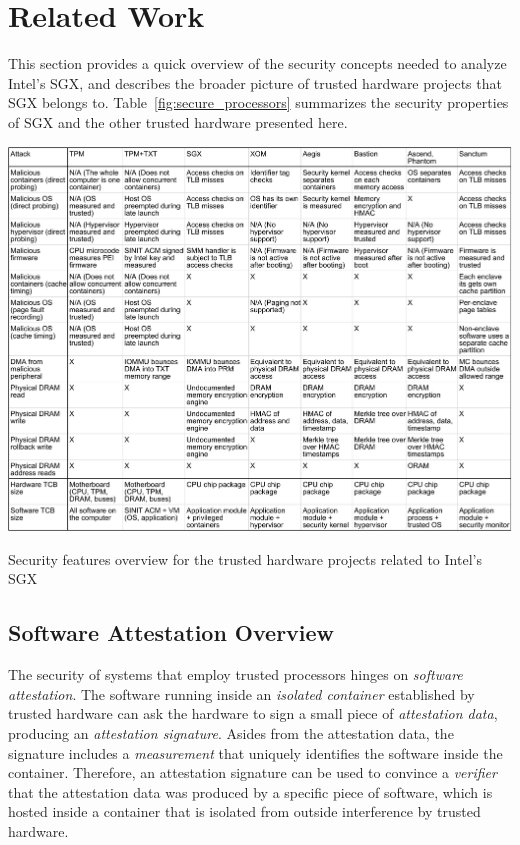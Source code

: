 \section{Related Work}
\label{sec:related}

This section provides a quick overview of the security concepts needed to
analyze Intel's SGX, and describes the broader picture of trusted hardware
projects that SGX belongs to. Table~\ref{fig:secure_processors} summarizes the
security properties of SGX and the other trusted hardware presented here.

\begin{table}
  \centering
  \includegraphics[angle=90,width=170mm]{figures/secure_processors_table.pdf}
  \caption{
    Security features overview for the trusted hardware projects related to
    Intel's SGX
  }
  \label{fig:secure_processors}
\end{table}


\subsection{Software Attestation Overview}

The security of systems that employ trusted processors hinges on
\textit{software attestation}. The software running inside an \textit{isolated
container} established by trusted hardware can ask the hardware to sign a
small piece of \textit{attestation data}, producing an
\textit{attestation signature}. Asides from the attestation data, the signature
includes a \textit{measurement} that uniquely identifies the software inside
the container. Therefore, an attestation signature can be used to convince a
\textit{verifier} that the attestation data was produced by a specific piece
of software, which is hosted inside a container that is isolated from outside
interference by trusted hardware.

